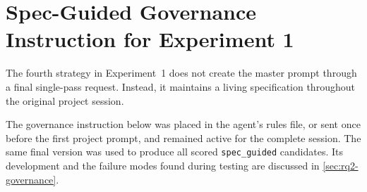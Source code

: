 \section{Spec-Guided Governance Instruction for Experiment 1}
\label{sec:governance-instruction}

The fourth strategy in Experiment~1 does not create the master prompt through
a final single-pass request. Instead, it maintains a living specification
throughout the original project session.

The governance instruction below was placed in the agent's rules file, or sent
once before the first project prompt, and remained active for the complete
session. The same final version was used to produce all scored
\texttt{spec\_guided} candidates. Its development and the failure modes found
during testing are discussed in \cref{sec:rq2-governance}.

